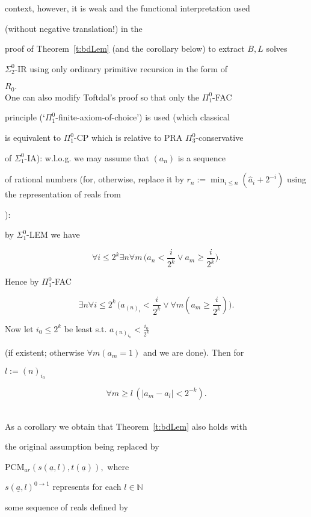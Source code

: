 \documentclass[1p]{elsarticle}
\newcommand{\NN}{\ensuremath{\mathbb{N}}}
\theoremstyle{plain}
\theoremstyle{definition}
\theoremstyle{remark}
\theoremstyle{definition}
\begin{document}
{context, however, it is weak and the functional interpretation used 

(without negative translation!) in the 

proof of Theorem~\ref{t:bdLem} (and the corollary below) to extract $B,L$ solves 

$\Sigma^0_2$-IR using only ordinary primitive recursion in the form of 

$R_0.$ \\ One can also modify Toftdal's proof so that only the $\Pi^0_1$-FAC 

principle (`$\Pi^0_1$-finite-axiom-of-choice') is used (which classical 

is equivalent to $\Pi^0_1$-CP which is relative to PRA $\Pi^0_3$-conservative 

of $\Sigma^0_1$-IA): w.l.o.g. we may assume that $(a_n)$ is a sequence 

of rational numbers (for, otherwise, replace it by $r_n:=\min_{i\le n} 

(\widehat{a}_i+2^{-i})$ using the representation of reals from 

\cite{Kohlenbach(book)}): 

by $\Sigma^0_1$-LEM we have 

\[ \forall i\le 2^{k}\exists n\forall m \,\big( a_n<\frac{i}{2^k} \vee 

a_m\ge \frac{i}{2^k}\big). \] 

Hence by $\Pi^0_1$-FAC 

\[ \exists n\forall i\le 2^k \,\big(a_{(n)_i} <\frac{i}{2^k}\vee 

\forall m (a_m\ge \frac{i}{2^k})\big). \] 

Now let $i_0\le 2^k$ be least s.t. $ a_{(n)_{i_0}} <\frac{i_0}{2^k}$ 

(if existent; otherwise $\forall m (a_m=1)$ and we are done). Then for 

$l:=(n)_{i_0}$ 

\[ \forall m\ge l \, (|a_m-a_l|<2^{-k}). \]   

\\[2mm]

As a corollary we obtain that Theorem~\ref{t:bdLem} also holds with 

the original assumption being replaced by 

PCM$_{ar}(s(\underline{a},l),t(\underline{a})),$ where 

$s(\underline{a},l)^{0\to 1}$ represents for each $l\in\NN$ 

some sequence of reals defined by 

}
\end{document}
